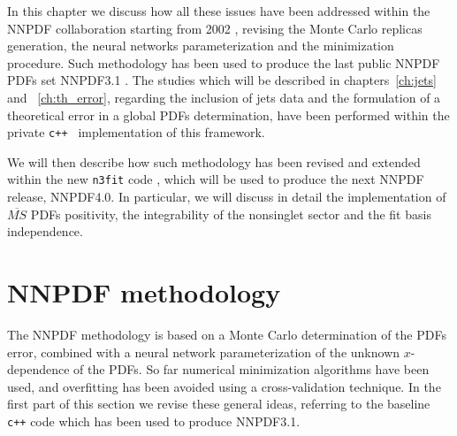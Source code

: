 %
In this chapter we discuss how all these issues have been addressed within the NNPDF collaboration
starting from 2002 \cite{Forte:2002fg}, revising the Monte Carlo replicas generation, the neural networks parameterization
and the minimization procedure. Such methodology has been used to produce the last public NNPDF PDFs set NNPDF3.1 \cite{Ball:2017nwa}
. The studies which will be described in chapters~\ref{ch:jets} and ~\ref{ch:th_error}, regarding the inclusion of jets data
and the formulation of a theoretical error in a global PDFs determination, have been performed within the private
{\tt c++ } implementation of this framework.

%
We will then describe how such methodology has been revised and extended 
within the new {\tt n3fit} code \cite{Carrazza:2019mzf}, which will be used to produce the next NNPDF release, NNPDF4.0.
In particular, we will discuss in detail the implementation of $\overline{MS}$ PDFs positivity,
the integrability of the nonsinglet sector and the fit basis independence.

\section{NNPDF methodology}
\label{sec:nnpdf_meth}

The NNPDF methodology is based on a Monte Carlo determination of the PDFs error, combined
with a neural network parameterization of the unknown $x$-dependence of the PDFs. So far numerical minimization algorithms
have been used, and overfitting has been avoided using a cross-validation technique.
In the first part of this section we revise these general ideas, referring to the baseline {\tt c++} code which
has been used to produce NNPDF3.1. 


